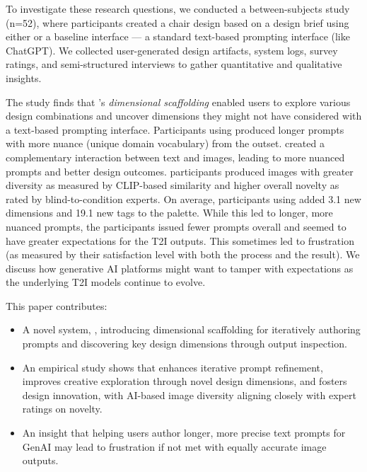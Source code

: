 To investigate these research questions, we conducted a between-subjects study (n=52), where participants created a chair design based on a design brief using either \toolname{} or a baseline interface --- a standard text-based prompting interface (like ChatGPT). We collected user-generated design artifacts, system logs, survey ratings, and semi-structured interviews to gather quantitative and qualitative insights.

The study finds that \toolname{}'s \textit{dimensional scaffolding} enabled users to explore various design combinations and uncover dimensions they might not have considered with a text-based prompting interface. Participants using \toolname{} produced longer prompts with more nuance (unique domain vocabulary) from the outset. \toolname{} created a complementary interaction between text and images, leading to more nuanced prompts and better design outcomes. \toolname{} participants produced images with greater diversity as measured by CLIP-based similarity \cite{radford2021learning} and higher overall novelty as rated by blind-to-condition experts. On average, participants using \toolname{} added 3.1 new dimensions and 19.1 new tags to the palette. While this led to longer, more nuanced prompts, the \toolname{} participants issued fewer prompts overall and seemed to have greater expectations for the T2I outputs. This sometimes led to frustration (as measured by their satisfaction level with both the process and the result). We discuss how generative AI platforms might want to tamper with expectations as the underlying T2I models continue to evolve.

This paper contributes: 
\begin{itemize} 
    \item A novel system, \toolname{}, introducing dimensional scaffolding for iteratively authoring prompts and discovering key design dimensions through output inspection.
    \item An empirical study shows that \toolname{} enhances iterative prompt refinement, improves creative exploration through novel design dimensions, and fosters design innovation, with AI-based image diversity aligning closely with expert ratings on novelty.
    \item An insight that helping users author longer, more precise text prompts for GenAI may lead to frustration if not met with equally accurate image outputs.
\end{itemize}
